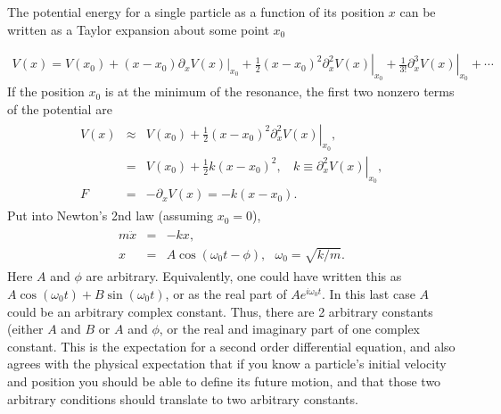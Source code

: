 \documentclass[letterpaper,10pt,english]{sphinxmanual}
\begin{document}
The potential energy for a single particle as a function of its position \(x\) can be written as a Taylor expansion about some point \(x_0\)




\begin{equation*}
\begin{split}
\begin{equation}
V(x)=V(x_0)+(x-x_0)\left.\partial_xV(x)\right|_{x_0}+\frac{1}{2}(x-x_0)^2\left.\partial_x^2V(x)\right|_{x_0}
+\frac{1}{3!}\left.\partial_x^3V(x)\right|_{x_0}+\cdots
\label{_auto1} \tag{1}
\end{equation}
\end{split}
\end{equation*}
If the position \(x_0\) is at the minimum of the resonance, the first two non\sphinxhyphen{}zero terms of the potential are
\begin{equation*}
\begin{split}
\begin{eqnarray}
V(x)&\approx& V(x_0)+\frac{1}{2}(x-x_0)^2\left.\partial_x^2V(x)\right|_{x_0},\\
\nonumber
&=&V(x_0)+\frac{1}{2}k(x-x_0)^2,~~~~k\equiv \left.\partial_x^2V(x)\right|_{x_0},\\
\nonumber
F&=&-\partial_xV(x)=-k(x-x_0).
\end{eqnarray}
\end{split}
\end{equation*}
Put into Newton’s 2nd law (assuming \(x_0=0\)),
\begin{equation*}
\begin{split}
\begin{eqnarray}
m\ddot{x}&=&-kx,\\
x&=&A\cos(\omega_0 t-\phi),~~~\omega_0=\sqrt{k/m}.
\end{eqnarray}
\end{split}
\end{equation*}
Here \(A\) and \(\phi\) are arbitrary. Equivalently, one could have
written this as \(A\cos(\omega_0 t)+B\sin(\omega_0 t)\), or as the real
part of \(Ae^{i\omega_0 t}\). In this last case \(A\) could be an
arbitrary complex constant. Thus, there are 2 arbitrary constants
(either \(A\) and \(B\) or \(A\) and \(\phi\), or the real and imaginary part
of one complex constant. This is the expectation for a second order
differential equation, and also agrees with the physical expectation
that if you know a particle’s initial velocity and position you should
be able to define its future motion, and that those two arbitrary
conditions should translate to two arbitrary constants.
\end{document}
